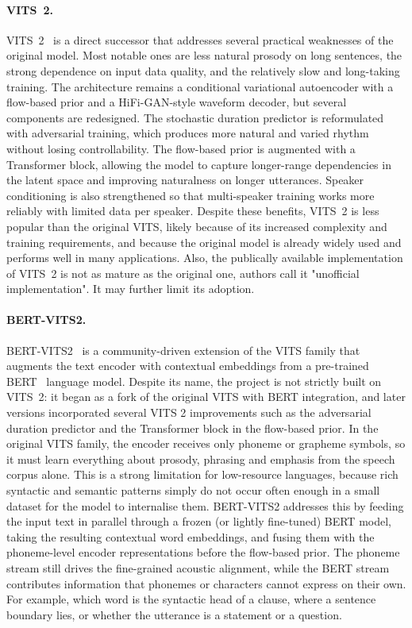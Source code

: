 \documentclass[
         english, %
    monochrome, %
]{VUMIFSEMasterThesis}
\begin{document}
\paragraph{VITS~2.}
VITS~2~\cite{kong2023vits2} is a direct successor that addresses several practical weaknesses of the original model.
Most notable ones are less natural prosody on long sentences, the strong dependence on input data quality, and the relatively slow and long-taking training.
The architecture remains a conditional variational autoencoder with a flow-based prior and a HiFi-GAN-style waveform decoder, but several components are redesigned.
The stochastic duration predictor is reformulated with adversarial training, which produces more natural and varied rhythm without losing controllability.
The flow-based prior is augmented with a Transformer block, allowing the model to capture longer-range dependencies in the latent space and improving naturalness on longer utterances.
Speaker conditioning is also strengthened so that multi-speaker training works more reliably with limited data per speaker.
Despite these benefits, VITS~2 is less popular than the original VITS, likely because of its increased complexity and training requirements, and because the original model is already widely used and performs well in many applications.
Also, the publically available implementation of VITS~2 is not as mature as the original one, authors call it "unofficial implementation". It may further limit its adoption.

\paragraph{BERT-VITS2.}
BERT-VITS2~\cite{bertvits2} is a community-driven extension of the VITS family that augments the text encoder with contextual embeddings from a pre-trained BERT~\cite{devlin2019bert} language model.
Despite its name, the project is not strictly built on VITS~2: it began as a fork of the original VITS with BERT integration, and later versions incorporated several VITS 2 improvements such as the adversarial duration predictor and the Transformer block in the flow-based prior.
In the original VITS family, the encoder receives only phoneme or grapheme symbols, so it must learn everything about prosody, phrasing and emphasis from the speech corpus alone.
This is a strong limitation for low-resource languages, because rich syntactic and semantic patterns simply do not occur often enough in a small dataset for the model to internalise them.
BERT-VITS2 addresses this by feeding the input text in parallel through a frozen (or lightly fine-tuned) BERT model, taking the resulting contextual word embeddings, and fusing them with the phoneme-level encoder representations before the flow-based prior.
The phoneme stream still drives the fine-grained acoustic alignment, while the BERT stream contributes information that phonemes or characters cannot express on their own.
For example, which word is the syntactic head of a clause, where a sentence boundary lies, or whether the utterance is a statement or a question.
\end{document}
